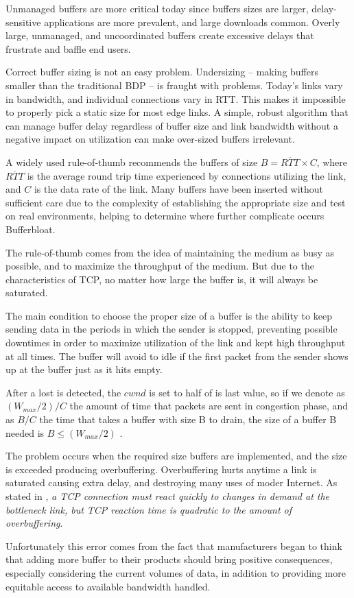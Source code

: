 Unmanaged buffers are more critical today since buffers sizes are larger,
delay-sensitive applications are more prevalent, and large downloads common.
Overly large, unmanaged, and uncoordinated buffers create excessive delays
that frustrate and baffle end users.

Correct buffer sizing is not an easy problem. Undersizing -- making buffers
smaller than the traditional BDP -- is fraught with problems. Today's links vary
in bandwidth, and individual connections vary in RTT. This makes it impossible
to properly pick a static size for most edge links. A simple, robust algorithm
that can manage buffer delay regardless of buffer size and link bandwidth
without a negative impact on utilization can make over-sized buffers
irrelevant.

A widely used rule-of-thumb recommends the buffers of size $B = \overline{RTT}
\times C $, where $\overline{RTT}$ is the average round trip time experienced by
connections utilizing the link, and $C$ is the data rate of the link. Many
buffers have been inserted without sufficient care due to the complexity of
establishing the appropriate size and test on real environments\cite{Vu-Brugier},
helping to determine where further complicate occurs Bufferbloat.

The rule-of-thumb comes from the idea of maintaining the medium as
busy as possible, and to maximize the throughput of the medium. But due to the
characteristics of TCP, no matter how large the buffer is, it will always be
saturated.

The main condition to choose the proper size of a buffer is the ability to
keep sending data in the periods in which the sender is stopped, preventing
possible downtimes in order to maximize utilization of the link and kept high
throughput at all times. The buffer will avoid to idle if the first packet
from the sender shows up at the buffer just as it hits empty.

After a lost is detected, the $cwnd$ is set to half of is last value, so if we
denote as $(W_{max} /2)/C$ the amount of time that packets are sent in
congestion phase, and as $B/C$ the time that takes a buffer with size B to
drain, the size of a buffer B needed is $B \leq (W_{max} /2)$
\cite{main:ref:1}.

The problem occurs when the required size buffers are implemented, and the
size is exceeded producing overbuffering. Overbuffering hurts anytime a link
is saturated causing extra delay, and destroying many uses of moder Internet.
As stated in \cite{GettysNichols}, \textit{a TCP connection must react quickly
to changes in demand at the bottleneck link, but TCP reaction time is
quadratic to the amount of overbuffering}.

Unfortunately this error comes from the fact that manufacturers began to think
that adding more buffer to their products should bring positive consequences,
especially considering the current volumes of data, in addition to providing
more equitable access to available bandwidth handled.
